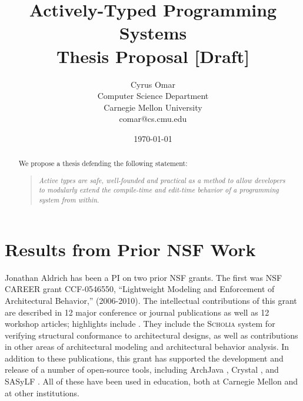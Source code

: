 \documentclass[10pt]{article}
\title{Actively-Typed Programming Systems\\\large{{Thesis Proposal [Draft]}}}
\author{Cyrus Omar\\
Computer Science Department\\
Carnegie Mellon University\\
comar@cs.cmu.edu}
\date{\today}                                           %
\begin{document}
\maketitle

\begin{abstract}
We propose a thesis defending the following statement:
\begin{quote}
\emph{{Active types} are safe, well-founded and practical as a method to allow developers to modularly extend the compile-time and edit-time behavior of a programming system from within. %
}
\end{quote}
\end{abstract}


\sloppy

\begin{center}



\normalsize
\end{center}









\section{Results from Prior NSF Work}

Jonathan Aldrich has been a PI on two prior NSF grants.  The first was
NSF CAREER grant CCF-0546550, ``Lightweight Modeling and Enforcement
of Architectural Behavior,'' (2006-2010).  The intellectual
contributions of this grant are described in 12 major conference or
journal publications as well as 12 workshop articles; highlights
include \cite{AAC07,AAN+08,AA07a,AA07b,AA08d,AA09a,AA09b,AB10}. They
include the \textsc{Scholia} system for verifying structural
conformance to architectural designs, as well as contributions in
other areas of architectural modeling and architectural behavior
analysis. In addition to these publications, this grant has supported
the development and release of a number of open-source tools,
including ArchJava \cite{ArchJava}, Crystal \cite{Crystal}, and SASyLF
\cite{SASyLF}. All of these have been used in education, both at
Carnegie Mellon and at other institutions.
\end{document}
